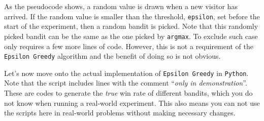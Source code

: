 \documentclass[
]{book}
\theoremstyle{definition}
\theoremstyle{definition}
\theoremstyle{definition}
\theoremstyle{definition}
\theoremstyle{remark}
\begin{document}
As the pseudocode shows, a random value is drawn when a new visitor has arrived. If the random value is smaller than the threshold, \texttt{epsilon}, set before the start of the experiment, then a random bandit is picked. Note that this randomly picked bandit can be the same as the one picked by \texttt{argmax}. To exclude such case only requires a few more lines of code. However, this is not a requirement of the \texttt{Epsilon\ Greedy} algorithm and the benefit of doing so is not obvious.

Let's now move onto the actual implementation of \texttt{Epsilon\ Greedy} in \texttt{Python}. Note that the script includes lines with the comment ``\emph{only in demonstration}''. These are codes to generate the \emph{true} win rate of different bandits, which you do not know when running a real-world experiment. This also means you can not use the scripts here in real-world problems without making necessary changes.
\end{document}
